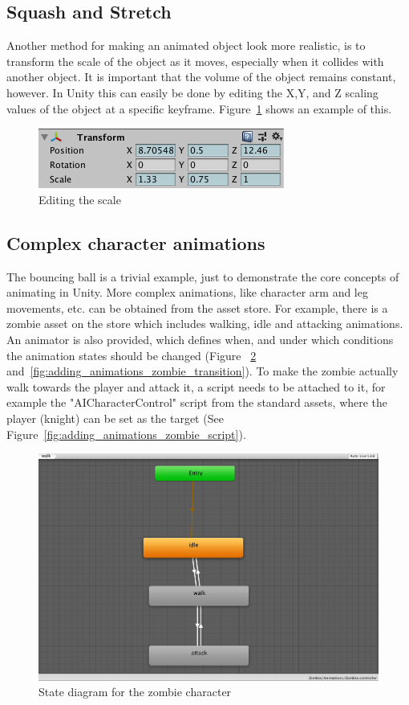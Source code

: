 \documentclass[conference]{IEEEtran}
\begin{document}
\subsection{Squash and Stretch}

Another method for making an animated object look more realistic, is to transform the scale of the object as it moves, especially when it collides with another object. It is important that the volume of the object remains constant, however. In Unity this can easily be done by editing the X,Y, and Z scaling values of the object at a specific keyframe. Figure~\ref{fig:adding_animations_scaling} shows an example of this.

\begin{figure}[htbp]
  \includegraphics[width=.4\textwidth]{pictures/animation_scale}
  \caption{Editing the scale}
  \label{fig:adding_animations_scaling}
\end{figure}

\subsection{Complex character animations}

The bouncing ball is a trivial example, just to demonstrate the core concepts of animating in Unity. More complex animations, like character arm and leg movements, etc. can be obtained from the asset store. For example, there is a zombie asset on the store which includes walking, idle and attacking animations. An animator is also provided, which defines when, and under which conditions the animation states should be changed (Figure ~\ref{fig:adding_animations_zombie_states} and~\ref{fig:adding_animations_zombie_transition}).  To make the zombie actually walk towards the player and attack it, a script needs to be attached to it, for example the "AICharacterControl" script from the standard assets, where the player (knight) can be set as the target (See Figure~\ref{fig:adding_animations_zombie_script}).

\begin{figure}[htbp]
  \includegraphics[width=.4\textwidth]{pictures/zombie_states}
  \caption{State diagram for the zombie character}
  \label{fig:adding_animations_zombie_states}
\end{figure}
\end{document}
